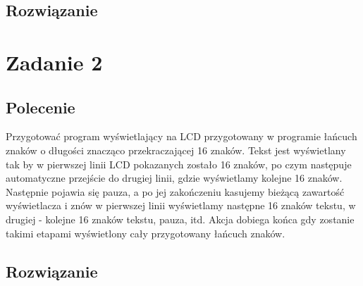 \documentclass[a4paper,12pt]{extarticle}  %
\begin{document}
\subsection{Rozwiązanie}

\section{Zadanie 2}
\subsection{Polecenie}
Przygotować program wyświetlający na LCD przygotowany w programie łańcuch znaków o długości
znacząco przekraczającej 16 znaków. Tekst jest wyświetlany tak by w pierwszej linii LCD pokazanych zostało
16 znaków, po czym następuje automatyczne przejście do drugiej linii, gdzie wyświetlamy kolejne 16 znaków.
Następnie pojawia się pauza, a po jej zakończeniu kasujemy bieżącą zawartość wyświetlacza i znów w pierwszej
linii wyświetlamy następne 16 znaków tekstu, w drugiej - kolejne 16 znaków tekstu, pauza, itd.
Akcja dobiega końca gdy zostanie takimi etapami wyświetlony cały przygotowany łańcuch znaków.
\subsection{Rozwiązanie}
% 
\end{document}
